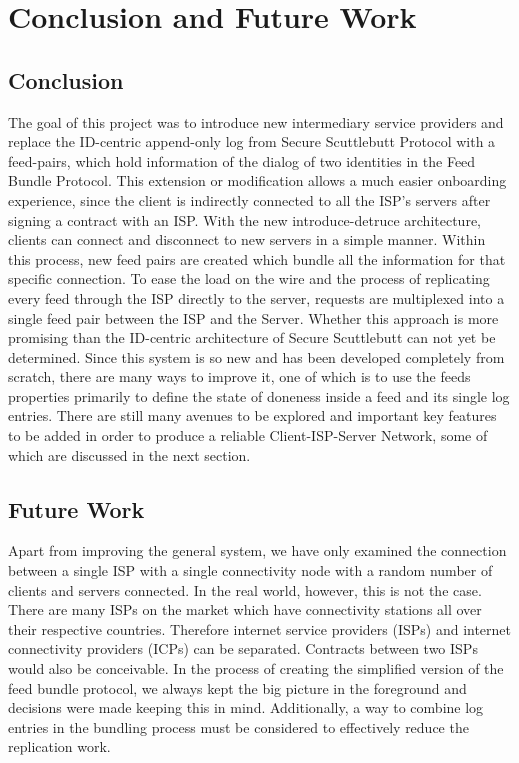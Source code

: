\chapter{Conclusion and Future Work}
\section{Conclusion}
The goal of this project was to introduce new intermediary service providers and replace the ID-centric append-only log from Secure Scuttlebutt Protocol with a feed-pairs, which hold information of the dialog of two identities in the Feed Bundle Protocol. This extension or modification allows a much easier onboarding experience, since the client is indirectly connected to all the ISP’s servers after signing a contract with an ISP. With the new
introduce-detruce architecture, clients can connect and disconnect to new servers in a simple manner. Within this process, new feed pairs are created which bundle all the information for that specific connection. To ease the load on the wire and the process of replicating every feed through the ISP directly to the server, requests are multiplexed into a single feed pair between the ISP and the Server. Whether this approach is more promising than the ID-centric architecture of Secure Scuttlebutt can not yet be determined. Since this system is so new and has been developed completely from scratch, there are many ways to improve it, one of which is to use the feeds properties primarily to define the state of doneness inside a feed and its single log entries. There are still many avenues to be explored and important key features to be added in order to produce a reliable Client-ISP-Server Network, some of which are discussed in the next section.

\section{Future Work}
Apart from improving the general system, we have only examined the connection between a single ISP with a single connectivity node with a random number of clients and servers connected. In the real world, however, this is not the case. There are many ISPs on the market which have connectivity stations all over their respective countries. Therefore internet service providers (ISPs) and internet connectivity providers (ICPs) can be separated. Contracts between two ISPs would also be conceivable. In the process of creating the simplified version of the feed bundle protocol, we always kept the big picture in the foreground and decisions were made keeping this in mind. Additionally, a way to combine log entries in the bundling process must be considered to effectively reduce the replication work.

